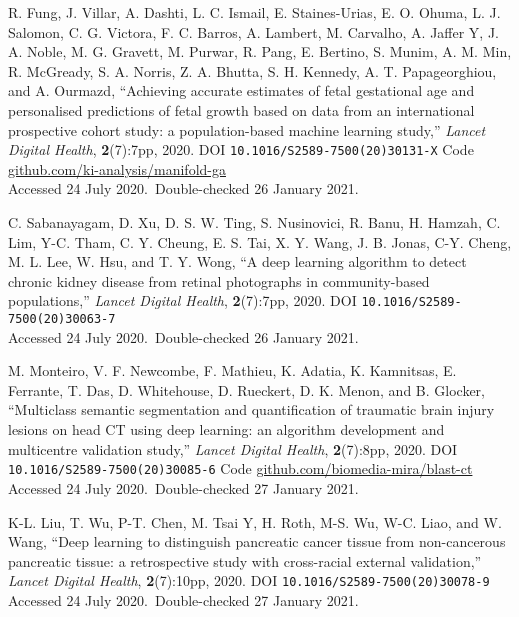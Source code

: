 \vbox{
{\sc R. Fung, J. Villar, A. Dashti, L. C. Ismail, E. Staines-Urias, E. O. Ohuma, L. J. Salomon, C. G. Victora, F. C. Barros, A. Lambert, M. Carvalho, A. Jaffer Y, J. A. Noble, M. G. Gravett, M. Purwar, R. Pang, E. Bertino, S. Munim, A. M. Min, R. McGready, S. A. Norris, Z. A. Bhutta, S. H. Kennedy, A. T. Papageorghiou, and A. Ourmazd}, ``Achieving accurate estimates of fetal gestational age and personalised predictions of fetal growth based on data from an international prospective cohort study: a population-based machine learning study,'' \emph{Lancet Digital Health}, \textbf{2}(7):7pp, 2020. DOI \texttt{10.1016/S2589-7500(20)30131-X} {Code \url{github.com/ki-analysis/manifold-ga}}\\\hfill{Accessed 24 July 2020.}\ {Double-checked 26 January 2021}.}\bibskip

\vbox{
{\sc C. Sabanayagam, D. Xu, D. S. W. Ting, S. Nusinovici, R. Banu, H. Hamzah, C. Lim, Y-C. Tham, C. Y. Cheung, E. S. Tai, X. Y. Wang, J. B. Jonas, C-Y. Cheng, M. L. Lee, W. Hsu, and T. Y. Wong}, ``A deep learning algorithm to detect chronic kidney disease from retinal photographs in community-based populations,'' \emph{Lancet Digital Health}, \textbf{2}(7):7pp, 2020. DOI \texttt{10.1016/S2589-7500(20)30063-7}\\\hfill{Accessed 24 July 2020.}\ {Double-checked 26 January 2021}.}\bibskip

\vbox{
{\sc M. Monteiro, V. F. Newcombe, F. Mathieu, K. Adatia, K. Kamnitsas, E. Ferrante, T. Das, D. Whitehouse, D. Rueckert, D. K. Menon, and B. Glocker}, ``Multiclass semantic segmentation and quantification of traumatic brain injury lesions on head CT using deep learning: an algorithm development and multicentre validation study,'' \emph{Lancet Digital Health}, \textbf{2}(7):8pp, 2020. DOI \texttt{10.1016/S2589-7500(20)30085-6} {Code \url{github.com/biomedia-mira/blast-ct}}\\\hfill{Accessed 24 July 2020.}\ {Double-checked 27 January 2021}.}\bibskip

\vbox{
{\sc K-L. Liu, T. Wu, P-T. Chen, M. Tsai Y, H. Roth, M-S. Wu, W-C. Liao, and W. Wang}, ``Deep learning to distinguish pancreatic cancer tissue from non-cancerous pancreatic tissue: a retrospective study with cross-racial external validation,'' \emph{Lancet Digital Health}, \textbf{2}(7):10pp, 2020. DOI \texttt{10.1016/S2589-7500(20)30078-9}\\\hfill{Accessed 24 July 2020.}\ {Double-checked 27 January 2021}.}\bibskip

